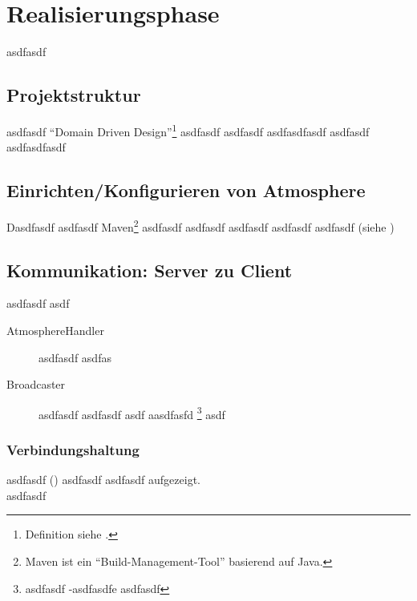 \clearpage


\section{Realisierungsphase}
\label{sec:Realisierungsphase}
asdfasdf

\subsection{Projektstruktur}
\label{sub:Projektstruktur}

asdfasdf "`Domain Driven
Design"'\footnote{Definition siehe .} asdfasdf  asdfasdf 
asdfasdfasdf  asdfasdf  asdfasdfasdf

\subsection{Einrichten/Konfigurieren von Atmosphere}
\label{sub:Einrichten/Konfigurieren von Atmosphere}
Dasdfasdf  asdfasdf Maven\footnote{Maven ist ein "`Build-Management-Tool"' basierend auf
Java.} asdfasdf  asdfasdf  asdfasdf  asdfasdf
 asdfasdf (siehe )

\subsection{Kommunikation: Server zu Client}
\label{sub:Kommunikation: Server zu Client}
asdfasdf asdf 
\begin{description}
    \item [AtmosphereHandler] asdfasdf   asdfas
    \item [Broadcaster] asdfasdf  asdfasdf  asdf
    aasdfasfd \sog {}\footnote{asdfasdf -asdfasdfe \zB asdfasdf} asdf
\end{description}

\subsubsection{Verbindungshaltung}
\label{subsub:Verbindungshaltung}
asdfasdf () asdfasdf  asdfasdf  aufgezeigt.\\
asdfasdf

